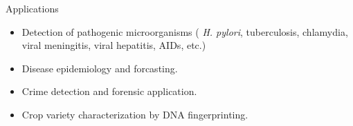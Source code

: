 \documentclass[
  ignorenonframetext,
  aspectratio=169]{beamer}
\providecommand{\tightlist}{%
  \setlength{\itemsep}{0pt}\setlength{\parskip}{0pt}}
\begin{document}
\begin{frame}{Applications}
\protect\hypertarget{applications}{}
\begin{itemize}
\tightlist
\item
  Detection of pathogenic microorganisms ( \emph{H. pylori},
  tuberculosis, chlamydia, viral meningitis, viral hepatitis, AIDs,
  etc.)
\item
  Disease epidemiology and forcasting.
\item
  Crime detection and forensic application.
\item
  Crop variety characterization by DNA fingerprinting.
\end{itemize}
\end{frame}
\end{document}
